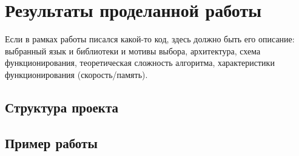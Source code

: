 \section{Результаты проделанной работы}
\label{sec:Chapter4} 
Если в рамках работы писался какой-то код, здесь должно быть его описание: выбранный язык и библиотеки и мотивы выбора, архитектура, схема функционирования, теоретическая сложность алгоритма, характеристики функционирования (скорость/память).

\subsection{Структура проекта}

\subsection{Пример работы}

\newpage